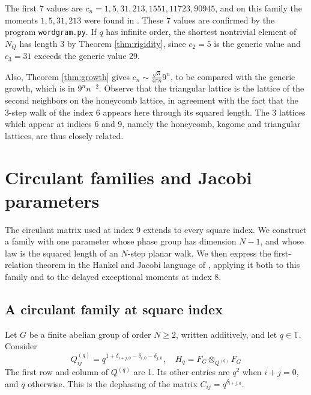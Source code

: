 \documentclass[11pt,reqno]{amsart}
\theoremstyle{definition}
\numberwithin{equation}{section}
\begin{document}
The first 7 values are $c_n=1,5,31,213,1551,11723,90945$, and on this family the moments $1,5,31,213$ were found in \cite{BO26}. These 7 values are confirmed by the program \texttt{wordgram.py}. If $q$ has infinite order, the shortest nontrivial element of $N_Q$ has length $3$ by Theorem \ref{thm:rigidity}, since $c_2=5$ is the generic value and $c_3=31$ exceeds the generic value $29$.

Also, Theorem \ref{thm:growth} gives $c_n\sim\frac{\sqrt3}{4\pi n}9^n$, to be compared with the generic growth, which is in $9^nn^{-2}$. Observe that the triangular lattice is the lattice of the second neighbors on the honeycomb lattice, in agreement with the fact that the 3-step walk of the index 6 appears here through its squared length. The 3 lattices which appear at indices 6 and 9, namely the honeycomb, kagome and triangular lattices, are thus closely related.

\section{Circulant families and Jacobi parameters}\label{sec:circulant-jacobi}

The circulant matrix used at index 9 extends to every square index. We construct a family with one parameter whose phase group has dimension $N-1$, and whose law is the squared length of an $N$-step planar walk. We then express the first-relation theorem in the Hankel and Jacobi language of \cite{BP26}, applying it both to this family and to the delayed exceptional moments at index 8.

\subsection{A circulant family at square index}

Let $G$ be a finite abelian group of order $N\geq2$, written additively, and let $q\in\mathbb T$. Consider
$$Q^{(q)}_{ij}=q^{1+\delta_{i+j,0}-\delta_{i,0}-\delta_{j,0}},\quad H_q=F_G\otimes_{Q^{(q)}}F_G$$
The first row and column of $Q^{(q)}$ are 1. Its other entries are $q^2$ when $i+j=0$, and $q$ otherwise. This is the dephasing of the matrix $C_{ij}=q^{\delta_{i+j,0}}$.
\end{document}
